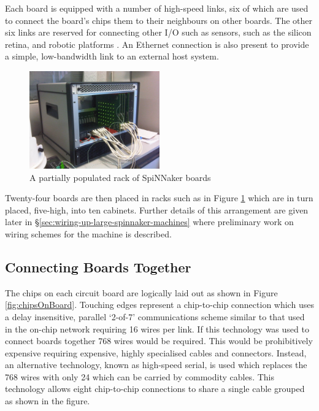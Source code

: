 			Each board is equipped with a number of high-speed links, six of which are
			used to connect the board's chips them to their neighbours on other
			boards. The other six links are reserved for connecting other I/O such as
			sensors, such as the silicon retina, and robotic platforms
			\cite{davies10}. An Ethernet connection is also present to provide a
			simple, low-bandwidth link to an external host system.
			
			\begin{figure}
				\center
				\includegraphics[width=0.5\textwidth]{figures/spiNNaker103.jpg}
				\caption{A partially populated rack of SpiNNaker boards}
				\label{fig:spiNNaker103}
			\end{figure}
			
			Twenty-four boards are then placed in racks such as in Figure
			\ref{fig:spiNNaker103} which are in turn placed, five-high, into ten
			cabinets. Further details of this arrangement are given later in
			\S\ref{sec:wiring-up-large-spinnaker-machines} where preliminary work on
			wiring schemes for the machine is described.
		
		\subsection{Connecting Boards Together}
			
			
			The chips on each circuit board are logically laid out as shown in Figure
			\ref{fig:chipsOnBoard}. Touching edges represent a chip-to-chip connection
			which uses a delay insensitive, parallel `2-of-7' communications scheme
			similar to that used in the on-chip network requiring 16 wires per link.
			If this technology was used to connect boards together 768 wires would be
			required.  This would be prohibitively expensive requiring expensive,
			highly specialised cables and connectors. Instead, an alternative
			technology, known as high-speed serial, is used which replaces the 768
			wires with only 24 which can be carried by commodity cables. This
			technology allows eight chip-to-chip connections to share a single cable
			grouped as shown in the figure.
			
